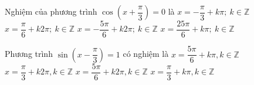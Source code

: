 \begin{ex}%
	Nghiệm của phương trình $\cos \left(x+\dfrac{\pi }{3}\right)=0$ là 
	\choice 
		{ $ x=-\dfrac{\pi  }{3}+k\pi; ~k\in \mathbb{Z}$}
		{\True $  x=\dfrac{\pi }{6}+k2\pi; ~k\in \mathbb{Z}$}
		{ $  x=-\dfrac{5\pi }{6}+k2\pi; ~k\in \mathbb{Z}$}
		{ $ x=\dfrac{25\pi }{6}+k\pi; ~k\in \mathbb{Z}$} 
\end{ex}

\begin{ex}%
	Phương trình $ \sin \left(x-\dfrac{\pi}{3}\right)=1 $  có nghiệm là
	\choice 
		{$x=\dfrac{5\pi}{6}+k\pi, k\in \mathbb{Z} $} 
		 {$x=\dfrac{\pi}{3}+k2\pi, k\in \mathbb{Z} $}
		{\True $x=\dfrac{5\pi}{6}+k2\pi, k\in  \mathbb{Z} $}
		 {$x=\dfrac{\pi}{3}+k\pi, k\in \mathbb{Z} $}
\end{ex}

